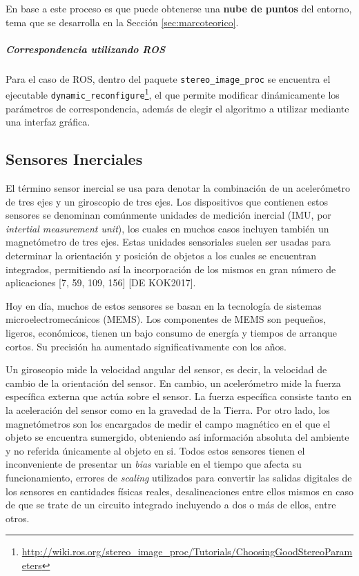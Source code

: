 En base a este proceso es que puede obtenerse una \textbf{nube de puntos} del entorno, tema que se desarrolla en la Sección \ref{sec:marcoteorico}.
\subparagraph{Correspondencia utilizando ROS}
Para el caso de ROS, dentro del paquete \texttt{stereo\_image\_proc} se encuentra el ejecutable \texttt{dynamic\_reconfigure}\footnote{\url{http://wiki.ros.org/stereo_image_proc/Tutorials/ChoosingGoodStereoParameters}}, el que permite modificar dinámicamente los parámetros de correspondencia, además de elegir el algoritmo a utilizar mediante una interfaz gráfica.

\ifimagenes
\else
\subsection{Sensores Inerciales}
El término sensor inercial se usa para denotar la combinación de un acelerómetro de tres ejes y un giroscopio de tres ejes. Los dispositivos que contienen estos sensores se denominan comúnmente unidades de medición inercial (IMU, por \textit{intertial measurement unit}), los cuales en muchos casos incluyen también un magnetómetro de tres ejes. Estas unidades sensoriales suelen ser usadas para determinar la orientación y posición de objetos a los cuales se encuentran integrados, permitiendo así la incorporación de los mismos en gran número de aplicaciones [7, 59, 109, 156] [DE KOK2017].

Hoy en día, muchos de estos sensores se basan en la tecnología de sistemas microelectromecánicos (MEMS). Los componentes de MEMS son pequeños, ligeros, económicos, tienen un bajo consumo de energía y tiempos de arranque cortos. Su precisión ha aumentado significativamente con los años.

Un giroscopio mide la velocidad angular del sensor, es decir, la velocidad de cambio de la orientación del sensor. En cambio, un acelerómetro mide la fuerza específica externa que actúa sobre el sensor. La fuerza específica consiste tanto en la aceleración del sensor como en la gravedad de la Tierra. Por otro lado, los magnetómetros son los encargados de medir el campo magnético en el que el objeto se encuentra sumergido, obteniendo así información absoluta del ambiente y no referida únicamente al objeto en si. Todos estos sensores tienen el inconveniente de presentar un \textit{bias} variable en el tiempo que afecta su funcionamiento, errores de \textit{scaling} utilizados para convertir las salidas digitales de los sensores en cantidades físicas reales, desalineaciones entre ellos mismos en caso de que se trate de un circuito integrado incluyendo a dos o más de ellos, entre otros.

